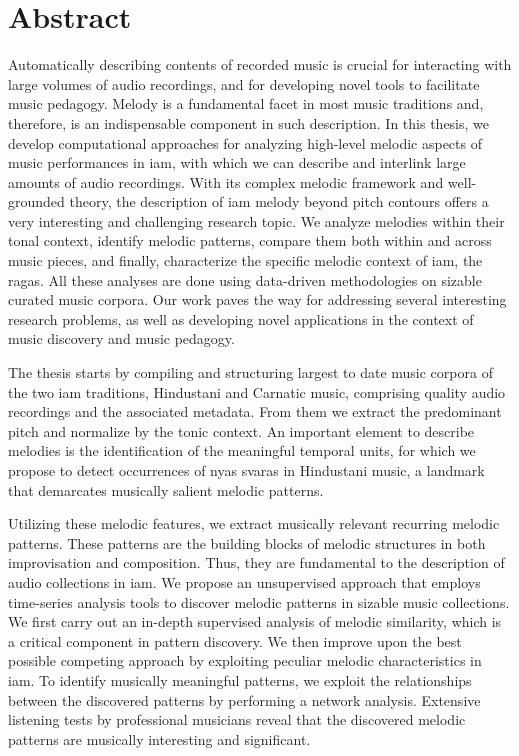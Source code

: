 
\chapter{Abstract}

Automatically describing contents of recorded music is crucial for interacting with large volumes of audio recordings, and for developing novel tools to facilitate music pedagogy. Melody is a fundamental facet in most music traditions and, therefore, is an indispensable component in such description. In this thesis, we develop computational approaches for analyzing high-level melodic aspects of music performances in \gls{iam}, with which we can describe and interlink large amounts of audio recordings. With its complex melodic framework and well-grounded theory, the description of \gls{iam} melody beyond pitch contours offers a very interesting and challenging research topic. We analyze melodies within their tonal context, identify melodic patterns, compare them both within and across music pieces, and finally, characterize the specific melodic context of \gls{iam}, the \glspl{raga}. All these analyses are done using data-driven methodologies on sizable curated music corpora. Our work paves the way for addressing several interesting research problems, as well as developing novel applications in the context of music discovery and music pedagogy.

The thesis starts by compiling and structuring largest to date music corpora of the two \gls{iam} traditions, Hindustani and Carnatic music, comprising quality audio recordings and the associated metadata. From them we extract the predominant pitch and normalize by the tonic context. An important element to describe melodies is the identification of the meaningful temporal units, for which we propose to detect occurrences of \gls{nyas} \glspl{svara} in Hindustani music, a landmark that demarcates musically salient melodic patterns.

Utilizing these melodic features, we extract musically relevant recurring melodic patterns. These patterns are the building blocks of melodic structures in both improvisation and composition. Thus, they are fundamental to the description of audio collections in \gls{iam}. We propose an unsupervised approach that employs time-series analysis tools to discover melodic patterns in sizable music collections. We first carry out an in-depth supervised analysis of melodic similarity, which is a critical component in pattern discovery. We then improve upon the best possible competing approach by exploiting peculiar melodic characteristics in \gls{iam}. To identify musically meaningful patterns, we exploit the relationships between the discovered patterns by performing a network analysis. Extensive listening tests by professional musicians reveal that the discovered melodic patterns are musically interesting and significant.

